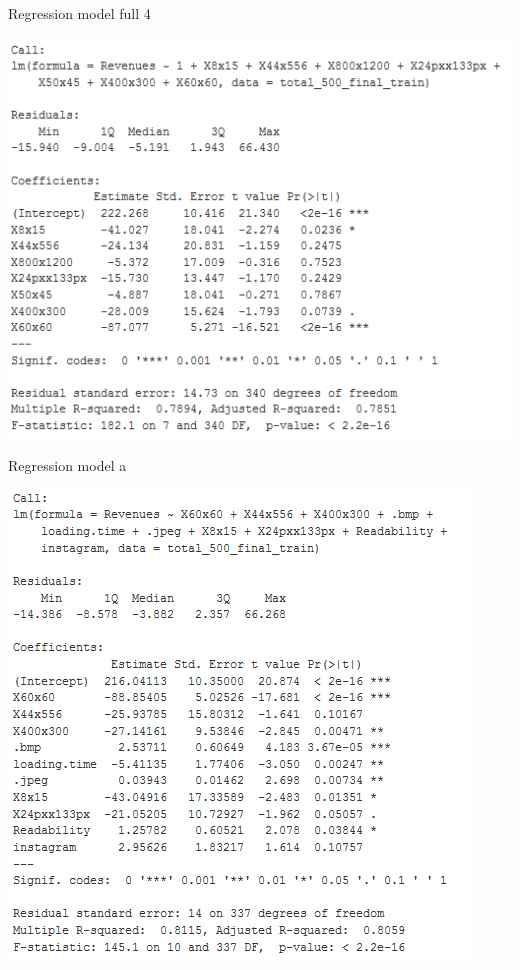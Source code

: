 \documentclass{article}
\begin{document}
\begin{table}[H]
\centering
\caption{Regression model full 4}\label{d :r :4}
\begin{center}
\includegraphics[scale=0.6]{../R/photos/77_full4.PNG}   \\
\end{center}
\end{table}


\begin{table}[H]
\centering
\caption{Regression model a}\label{d :r :a}
\begin{center}
\includegraphics[scale=0.6]{../R/photos/81_modela.PNG}   \\
\end{center}
\end{table}
\end{document}
